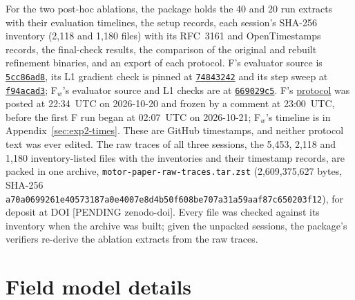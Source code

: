 \documentclass{anvil-paper}
\begin{document}
For the two post-hoc ablations, the package holds the 40 and 20 run
extracts with their evaluation timelines, the setup records, each session's SHA-256 inventory (2,118 and
1,180 files) with its RFC~3161 and OpenTimestamps records, the final-check
results, the comparison of the original and rebuilt refinement binaries,
and an export of each protocol. F's evaluator source is
\href{https://github.com/rjwalters/geode-fem/tree/5cc86ad81aeea4847a2608fcafde22a1bbfb6990/benchmarks/motor_optimization}{\texttt{5cc86ad8}},
its L1 gradient check is pinned at
\href{https://github.com/rjwalters/geode-fem/tree/74843242db03e8d57edf971420171064bf19f107/benchmarks/motor_optimization/harness}{\texttt{74843242}}
and its step sweep at
\href{https://github.com/rjwalters/geode-fem/tree/f94acad3f312c7d417830ff82b66a78a1ea89fb2/benchmarks/motor_optimization/harness}{\texttt{f94acad3}};
F$_w$'s evaluator source and L1 checks are at
\href{https://github.com/rjwalters/geode-fem/tree/669029c5653cb5fe4724ec0c7525ba60c770975e/benchmarks/motor_optimization}{\texttt{669029c5}}.
F's \href{https://github.com/rjwalters/geode-fem/issues/1218}{protocol}
was posted at 22:34~UTC on 2026-10-20 and frozen by a comment at
23:00~UTC, before the first F run began at 02:07~UTC on 2026-10-21;
F$_w$'s timeline is in Appendix~\ref{sec:exp2-times}. These are GitHub
timestamps, and neither protocol text was ever edited. The raw traces of all
three sessions, the 5,453, 2,118 and 1,180 inventory-listed files with the
inventories and their timestamp records, are packed in one archive,
\texttt{motor-paper-raw-traces.tar.zst} (2,609,375,627 bytes, SHA-256
\texttt{a70a0699261e40573187a0e4007e8d4b}\allowbreak\texttt{50f608be707a31a59aaf87c650203f12}), for deposit at
DOI [PENDING zenodo-doi]. Every file was checked against its inventory
when the archive was built; given the unpacked sessions, the package's
verifiers re-derive the ablation extracts from the raw traces.

\appendix
\section{Field model details}\label{sec:fieldmodel}
\end{document}
